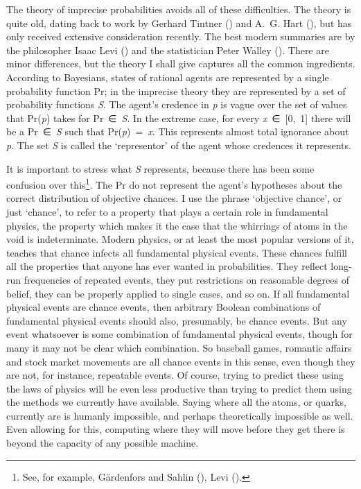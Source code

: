 \documentclass[
  10pt,
  letterpaper,
  DIV=11,
  numbers=noendperiod,
  twoside]{scrartcl}
\begin{document}
The theory of imprecise probabilities avoids all of these difficulties.
The theory is quite old, dating back to work by Gerhard Tintner
() and A.~G. Hart
(), but has only received extensive
consideration recently. The best modern summaries are by the philosopher
Isaac Levi () and the statistician Peter
Walley (). There are minor differences,
but the theory I shall give captures all the common ingredients.
According to Bayesians, states of rational agents are represented by a
single probability function Pr; in the imprecise theory they are
represented by a set of probability functions \emph{S}. The agent's
credence in \emph{p} is vague over the set of values that Pr(\emph{p})
takes for Pr~∈~\emph{S}. In the extreme case, for every
\emph{x}~∈~{[}0,~1{]} there will be a Pr~∈~\emph{S} such that
Pr(\emph{p})~=~\emph{x}. This represents almost total ignorance about
\emph{p}. The set \emph{S} is called the `representor' of the agent
whose credences it represents.

It is important to stress what \emph{S} represents, because there has
been some confusion over this\footnote{See, for example, Gärdenfors and
  Sahlin (), Levi
  ().}. The Pr do not represent the agent's
hypotheses about the correct distribution of objective chances. I use
the phrase `objective chance', or just `chance', to refer to a property
that plays a certain role in fundamental physics, the property which
makes it the case that the whirrings of atoms in the void is
indeterminate. Modern physics, or at least the most popular versions of
it, teaches that chance infects all fundamental physical events. These
chances fulfill all the properties that anyone has ever wanted in
probabilities. They reflect long-run frequencies of repeated events,
they put restrictions on reasonable degrees of belief, they can be
properly applied to single cases, and so on. If all fundamental physical
events are chance events, then arbitrary Boolean combinations of
fundamental physical events should also, presumably, be chance events.
But any event whatsoever is some combination of fundamental physical
events, though for many it may not be clear which combination. So
baseball games, romantic affairs and stock market movements are all
chance events in this sense, even though they are not, for instance,
repeatable events. Of course, trying to predict these using the laws of
physics will be even less productive than trying to predict them using
the methods we currently have available. Saying where all the atoms, or
quarks, currently are is humanly impossible, and perhaps theoretically
impossible as well. Even allowing for this, computing where they will
move before they get there is beyond the capacity of any possible
machine.
\end{document}
